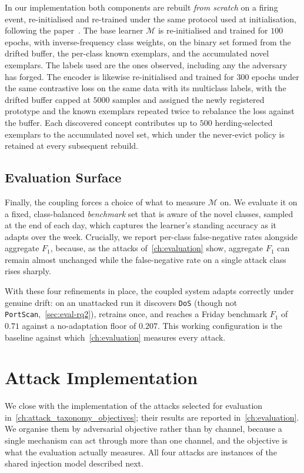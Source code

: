In our implementation both components are rebuilt \emph{from scratch} on a firing event, re-initialised and re-trained under the same protocol used at initialisation, following the paper~\cite{Kuppa_2022}. The base learner $\mathcal{M}$ is re-initialised and trained for $100$ epochs, with inverse-frequency class weights, on the binary set formed from the drifted buffer, the per-class known exemplars, and the accumulated novel exemplars. The labels used are the ones observed, including any the adversary has forged. The encoder is likewise re-initialised and trained for $300$ epochs under the same contrastive loss on the same data with its multiclass labels, with the drifted buffer capped at $5000$ samples and assigned the newly registered prototype and the known exemplars repeated twice to rebalance the loss against the buffer. Each discovered concept contributes up to $500$ herding-selected exemplars to the accumulated novel set, which under the never-evict policy is retained at every subsequent rebuild.

\subsection{Evaluation Surface}
\label{sec:impl-eval}
Finally, the coupling forces a choice of what to measure $\mathcal{M}$ on. We evaluate it on a fixed, class-balanced \emph{benchmark} set that is aware of the novel classes, sampled at the end of each day, which captures the learner's standing accuracy as it adapts over the week. Crucially, we report per-class false-negative rates alongside aggregate $F_1$, because, as the attacks of~\cref{ch:evaluation} show, aggregate $F_1$ can remain almost unchanged while the false-negative rate on a single attack class rises sharply.

With these four refinements in place, the coupled system adapts correctly under genuine drift: on an unattacked run it discovers \texttt{DoS} (though not \texttt{PortScan},~\cref{sec:eval-rq2}), retrains once, and reaches a Friday benchmark $F_1$ of $0.71$ against a no-adaptation floor of $0.207$. This working configuration is the baseline against which~\cref{ch:evaluation} measures every attack.

\section{Attack Implementation}
\label{sec:impl-attacks}
We close with the implementation of the attacks selected for evaluation in~\cref{ch:attack_taxonomy_objectives}; their results are reported in~\cref{ch:evaluation}. We organise them by adversarial objective rather than by channel, because a single mechanism can act through more than one channel, and the objective is what the evaluation actually measures. All four attacks are instances of the shared injection model described next.

